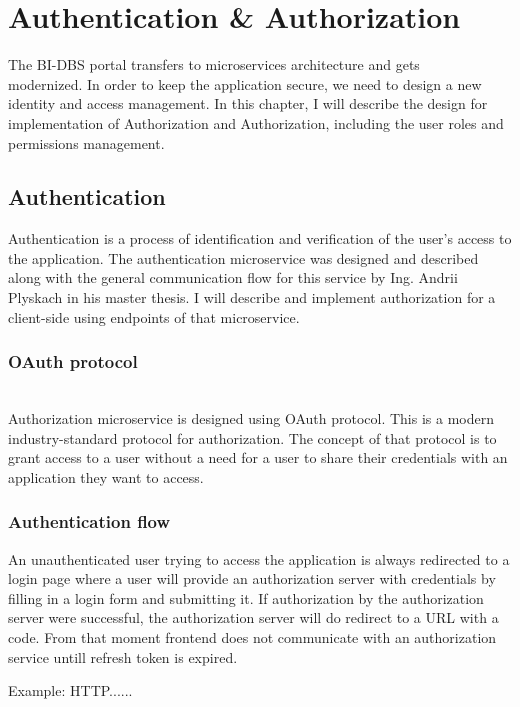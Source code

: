 \chapter{Authentication \& Authorization}

The BI-DBS portal transfers to microservices architecture and gets \\  
 modernized. In order to keep the application secure, we need to design a new identity and access management. In this chapter, I will describe the design for implementation of Authorization and Authorization, including the user roles and permissions management.

\section{Authentication}\label{sec:authentication}

Authentication is a process of identification and verification of the user's access to the application. The authentication microservice was designed and described along with the general communication flow for this service by Ing. Andrii Plyskach in his master thesis. I will describe and implement authorization for a client-side using endpoints of that microservice.


\subsection{OAuth protocol}
\\Authorization microservice is designed using OAuth protocol. This is a modern industry-standard protocol for authorization. The concept of that protocol is to grant access to a user without a need for a user to share their credentials with an application they want to access.

 
 \subsection{Authentication flow}
 An unauthenticated user trying to access the application is always redirected to a login page where a user will provide an authorization server with credentials by filling in a login form and submitting it. If authorization by the authorization server were successful, the authorization server will do redirect to a URL with a code. From that moment frontend does not communicate with an authorization service untill refresh token is expired.



Example: HTTP......

